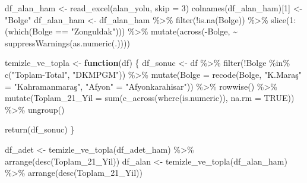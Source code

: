 \documentclass[
  11pt,
  a4paper,
  DIV=11,
  numbers=noendperiod]{scrartcl}
\newenvironment{Shaded}{\begin{snugshade}}{\end{snugshade}}
\newcommand{\AttributeTok}[1]{\textcolor[rgb]{0.40,0.45,0.13}{#1}}
\newcommand{\ConstantTok}[1]{\textcolor[rgb]{0.56,0.35,0.01}{#1}}
\newcommand{\ControlFlowTok}[1]{\textcolor[rgb]{0.00,0.23,0.31}{\textbf{#1}}}
\newcommand{\DecValTok}[1]{\textcolor[rgb]{0.68,0.00,0.00}{#1}}
\newcommand{\FunctionTok}[1]{\textcolor[rgb]{0.28,0.35,0.67}{#1}}
\newcommand{\NormalTok}[1]{\textcolor[rgb]{0.00,0.23,0.31}{#1}}
\newcommand{\OtherTok}[1]{\textcolor[rgb]{0.00,0.23,0.31}{#1}}
\newcommand{\SpecialCharTok}[1]{\textcolor[rgb]{0.37,0.37,0.37}{#1}}
\newcommand{\StringTok}[1]{\textcolor[rgb]{0.13,0.47,0.30}{#1}}
\begin{document}
\begin{Shaded}
\begin{Highlighting}[]
\NormalTok{df\_alan\_ham }\OtherTok{\textless{}{-}} \FunctionTok{read\_excel}\NormalTok{(alan\_yolu, }\AttributeTok{skip =} \DecValTok{3}\NormalTok{)}
\FunctionTok{colnames}\NormalTok{(df\_alan\_ham)[}\DecValTok{1}\NormalTok{] }\OtherTok{\textless{}{-}} \StringTok{"Bolge"}
\NormalTok{df\_alan\_ham }\OtherTok{\textless{}{-}}\NormalTok{ df\_alan\_ham }\SpecialCharTok{\%\textgreater{}\%} 
  \FunctionTok{filter}\NormalTok{(}\SpecialCharTok{!}\FunctionTok{is.na}\NormalTok{(Bolge)) }\SpecialCharTok{\%\textgreater{}\%} 
  \FunctionTok{slice}\NormalTok{(}\DecValTok{1}\SpecialCharTok{:}\NormalTok{(}\FunctionTok{which}\NormalTok{(Bolge }\SpecialCharTok{==} \StringTok{"Zonguldak"}\NormalTok{))) }\SpecialCharTok{\%\textgreater{}\%}
  \FunctionTok{mutate}\NormalTok{(}\FunctionTok{across}\NormalTok{(}\SpecialCharTok{{-}}\NormalTok{Bolge, }\SpecialCharTok{\textasciitilde{}} \FunctionTok{suppressWarnings}\NormalTok{(}\FunctionTok{as.numeric}\NormalTok{(.))))}

\NormalTok{temizle\_ve\_topla }\OtherTok{\textless{}{-}} \ControlFlowTok{function}\NormalTok{(df) \{}
\NormalTok{  df\_sonuc }\OtherTok{\textless{}{-}}\NormalTok{ df }\SpecialCharTok{\%\textgreater{}\%} 
    \FunctionTok{filter}\NormalTok{(}\SpecialCharTok{!}\NormalTok{Bolge }\SpecialCharTok{\%in\%} \FunctionTok{c}\NormalTok{(}\StringTok{"Toplam{-}Total"}\NormalTok{, }\StringTok{"DKMPGM"}\NormalTok{)) }\SpecialCharTok{\%\textgreater{}\%}
    \FunctionTok{mutate}\NormalTok{(}\AttributeTok{Bolge =} \FunctionTok{recode}\NormalTok{(Bolge, }\StringTok{"K.Maraş"} \OtherTok{=} \StringTok{"Kahramanmaraş"}\NormalTok{, }\StringTok{"Afyon"} \OtherTok{=} \StringTok{"Afyonkarahisar"}\NormalTok{)) }\SpecialCharTok{\%\textgreater{}\%}
    \FunctionTok{rowwise}\NormalTok{() }\SpecialCharTok{\%\textgreater{}\%}
    \FunctionTok{mutate}\NormalTok{(}\AttributeTok{Toplam\_21\_Yil =} \FunctionTok{sum}\NormalTok{(}\FunctionTok{c\_across}\NormalTok{(}\FunctionTok{where}\NormalTok{(is.numeric)), }\AttributeTok{na.rm =} \ConstantTok{TRUE}\NormalTok{)) }\SpecialCharTok{\%\textgreater{}\%}
    \FunctionTok{ungroup}\NormalTok{()}
  
  \FunctionTok{return}\NormalTok{(df\_sonuc)}
\NormalTok{\}}

\NormalTok{df\_adet }\OtherTok{\textless{}{-}} \FunctionTok{temizle\_ve\_topla}\NormalTok{(df\_adet\_ham) }\SpecialCharTok{\%\textgreater{}\%} \FunctionTok{arrange}\NormalTok{(}\FunctionTok{desc}\NormalTok{(Toplam\_21\_Yil))}
\NormalTok{df\_alan }\OtherTok{\textless{}{-}} \FunctionTok{temizle\_ve\_topla}\NormalTok{(df\_alan\_ham) }\SpecialCharTok{\%\textgreater{}\%} \FunctionTok{arrange}\NormalTok{(}\FunctionTok{desc}\NormalTok{(Toplam\_21\_Yil))}
\end{Highlighting}
\end{Shaded}
\end{document}
